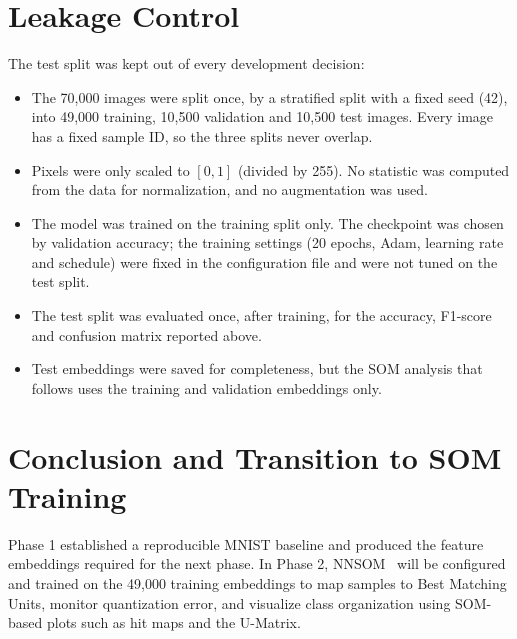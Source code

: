 \documentclass[11pt]{article}
\begin{document}
\section{Leakage Control}

The test split was kept out of every development decision:

\begin{itemize}
    \item The 70,000 images were split once, by a stratified split with a fixed
    seed (42), into 49,000 training, 10,500 validation and 10,500 test images.
    Every image has a fixed sample ID, so the three splits never overlap.

    \item Pixels were only scaled to $[0,1]$ (divided by 255). No statistic was
    computed from the data for normalization, and no augmentation was used.

    \item The model was trained on the training split only. The checkpoint was
    chosen by validation accuracy; the training settings (20 epochs, Adam,
    learning rate and schedule) were fixed in the configuration file and were
    not tuned on the test split.

    \item The test split was evaluated once, after training, for the accuracy,
    F1-score and confusion matrix reported above.

    \item Test embeddings were saved for completeness, but the SOM analysis that
    follows uses the training and validation embeddings only.
\end{itemize}

\section{Conclusion and Transition to SOM Training}

Phase 1 established a reproducible MNIST baseline and produced the
feature embeddings required for the next phase. In Phase 2, NNSOM~\cite{jafari_nnsom} will
be configured and trained on the 49,000 training embeddings to map
samples to Best Matching Units, monitor quantization error, and
visualize class organization using SOM-based plots such as hit maps
and the U-Matrix.

\clearpage
\printbibliography[title={References}]
\end{document}

